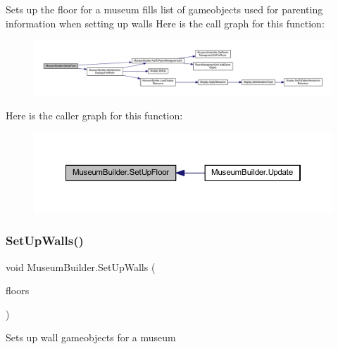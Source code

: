 Sets up the floor for a museum fills list of gameobjects used for parenting information when setting up walls Here is the call graph for this function\+:
\nopagebreak
\begin{figure}[H]
\begin{center}
\leavevmode
\includegraphics[width=350pt]{class_museum_builder_a7a68d64f1f418c4cdf43afc48ffa07b1_cgraph}
\end{center}
\end{figure}
Here is the caller graph for this function\+:
\nopagebreak
\begin{figure}[H]
\begin{center}
\leavevmode
\includegraphics[width=350pt]{class_museum_builder_a7a68d64f1f418c4cdf43afc48ffa07b1_icgraph}
\end{center}
\end{figure}
\mbox{\label{class_museum_builder_a52350d2e48a73d0e5400e2d8d31a8913}} 
\subsubsection{\texorpdfstring{Set\+Up\+Walls()}{SetUpWalls()}}
{\footnotesize\ttfamily void Museum\+Builder.\+Set\+Up\+Walls (\begin{DoxyParamCaption}\item[{List$<$ Game\+Object $>$}]{floors }\end{DoxyParamCaption})\hspace{0.3cm}{\ttfamily [private]}}



Sets up wall gameobjects for a museum 


